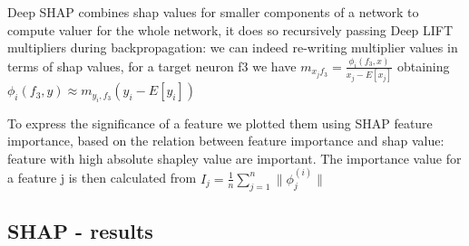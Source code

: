 \documentclass[a4paper,11pt]{article}
\begin{document}
Deep SHAP combines shap values for smaller components of a network to compute valuer for the whole network, it does so recursively passing Deep LIFT multipliers during backpropagation: we can indeed re-writing multiplier values in terms of shap values, for a target neuron f3 we have $m_{x_j f_3} = \frac{\phi_i(f_3, x)}{x_j - E[x_j]}$ obtaining $\phi_i(f_3, y) \approx m_{y_i, f_3}(y_i - E[y_i])$

To express the significance of a feature we plotted them using SHAP feature importance, based on the relation between feature importance and shap value: feature with high absolute shapley value are important. The importance value for a feature j is then calculated from $I_j = \frac{1}{n} \sum_{j = 1}^n \|\phi_j^{(i)}\|$

\subsection{SHAP - results}


\appendix
\end{document}
